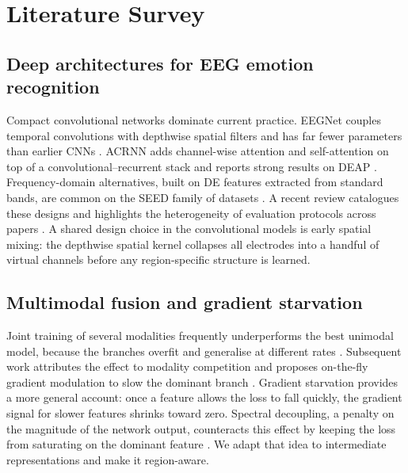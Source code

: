 \documentclass[a4paper,fleqn]{cas-sc}
\begin{document}
\section{Literature Survey}
\label{sec:related}

\subsection{Deep architectures for EEG emotion recognition}
Compact convolutional networks dominate current practice. EEGNet couples temporal convolutions with depthwise spatial filters and has far fewer parameters than earlier CNNs \citep{lawhern2018eegnet}. ACRNN adds channel-wise attention and self-attention on top of a convolutional--recurrent stack and reports strong results on DEAP \citep{tao2020acrnn}. Frequency-domain alternatives, built on DE features extracted from standard bands, are common on the SEED family of datasets \citep{duan2013de,zheng2015seed}. A recent review catalogues these designs and highlights the heterogeneity of evaluation protocols across papers \citep{li2022tutorial}. A shared design choice in the convolutional models is early spatial mixing: the depthwise spatial kernel collapses all electrodes into a handful of virtual channels before any region-specific structure is learned.

\subsection{Multimodal fusion and gradient starvation}
Joint training of several modalities frequently underperforms the best unimodal model, because the branches overfit and generalise at different rates \citep{wang2020makes}. Subsequent work attributes the effect to modality competition and proposes on-the-fly gradient modulation to slow the dominant branch \citep{peng2022balanced,huang2022modality}. Gradient starvation provides a more general account: once a feature allows the loss to fall quickly, the gradient signal for slower features shrinks toward zero. Spectral decoupling, a penalty on the magnitude of the network output, counteracts this effect by keeping the loss from saturating on the dominant feature \citep{pezeshki2021gradient}. We adapt that idea to intermediate representations and make it region-aware.
\end{document}
